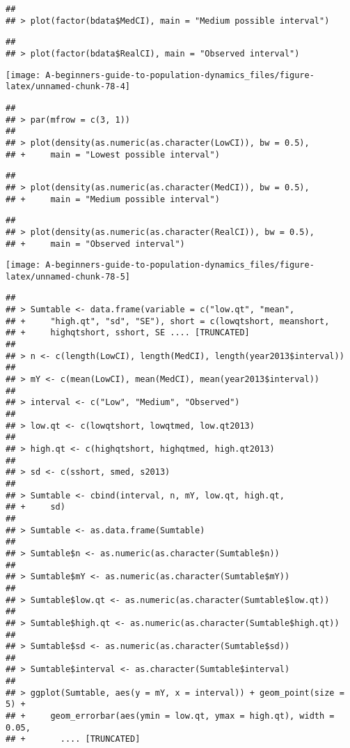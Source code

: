 \documentclass[]{book}
\begin{document}
\begin{verbatim}
## 
## > plot(factor(bdata$MedCI), main = "Medium possible interval")
\end{verbatim}

\begin{verbatim}
## 
## > plot(factor(bdata$RealCI), main = "Observed interval")
\end{verbatim}

\begin{center}\texttt{[image: A-beginners-guide-to-population-dynamics\_files/figure-latex/unnamed-chunk-78-4]} \end{center}

\begin{verbatim}
## 
## > par(mfrow = c(3, 1))
## 
## > plot(density(as.numeric(as.character(LowCI)), bw = 0.5), 
## +     main = "Lowest possible interval")
\end{verbatim}

\begin{verbatim}
## 
## > plot(density(as.numeric(as.character(MedCI)), bw = 0.5), 
## +     main = "Medium possible interval")
\end{verbatim}

\begin{verbatim}
## 
## > plot(density(as.numeric(as.character(RealCI)), bw = 0.5), 
## +     main = "Observed interval")
\end{verbatim}

\begin{center}\texttt{[image: A-beginners-guide-to-population-dynamics\_files/figure-latex/unnamed-chunk-78-5]} \end{center}

\begin{verbatim}
## 
## > Sumtable <- data.frame(variable = c("low.qt", "mean", 
## +     "high.qt", "sd", "SE"), short = c(lowqtshort, meanshort, 
## +     highqtshort, sshort, SE .... [TRUNCATED] 
## 
## > n <- c(length(LowCI), length(MedCI), length(year2013$interval))
## 
## > mY <- c(mean(LowCI), mean(MedCI), mean(year2013$interval))
## 
## > interval <- c("Low", "Medium", "Observed")
## 
## > low.qt <- c(lowqtshort, lowqtmed, low.qt2013)
## 
## > high.qt <- c(highqtshort, highqtmed, high.qt2013)
## 
## > sd <- c(sshort, smed, s2013)
## 
## > Sumtable <- cbind(interval, n, mY, low.qt, high.qt, 
## +     sd)
## 
## > Sumtable <- as.data.frame(Sumtable)
## 
## > Sumtable$n <- as.numeric(as.character(Sumtable$n))
## 
## > Sumtable$mY <- as.numeric(as.character(Sumtable$mY))
## 
## > Sumtable$low.qt <- as.numeric(as.character(Sumtable$low.qt))
## 
## > Sumtable$high.qt <- as.numeric(as.character(Sumtable$high.qt))
## 
## > Sumtable$sd <- as.numeric(as.character(Sumtable$sd))
## 
## > Sumtable$interval <- as.character(Sumtable$interval)
## 
## > ggplot(Sumtable, aes(y = mY, x = interval)) + geom_point(size = 5) + 
## +     geom_errorbar(aes(ymin = low.qt, ymax = high.qt), width = 0.05, 
## +       .... [TRUNCATED]
\end{verbatim}
\end{document}
